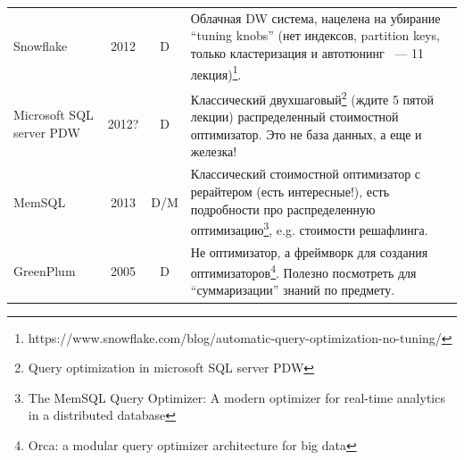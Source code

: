 \documentclass{beamer}
\begin{document}
\begin{frame}[allowframebreaks]
\begin{table}
\begin{longtable}{|p{2cm}|c|c|p{7.2cm}|}
	
	Snowflake & 2012 & D & Облачная DW система, нацелена на убирание ``tuning knobs'' (нет индексов, partition keys, только кластеризация и автотюнинг ~--- 11 лекция)\footnote{https://www.snowflake.com/blog/automatic-query-optimization-no-tuning/}.\\
	
	Microsoft SQL server PDW & 2012? & D & Классический двухшаговый\footnote{Query optimization in microsoft SQL server PDW} (ждите 5 пятой лекции) распределенный стоимостной оптимизатор. Это не база данных, а еще и железка!\\
	
	MemSQL & 2013 & D/M & Классический стоимостной оптимизатор с рерайтером (есть интересные!), есть подробности про распределенную оптимизацию\footnote{The MemSQL Query Optimizer: A modern optimizer for real-time analytics in a distributed database}, e.g. стоимости решафлинга.\\
	
	GreenPlum & 2005 & D & Не оптимизатор, а фреймворк для создания оптимизаторов\footnote{Orca: a modular query optimizer architecture for big data}. Полезно посмотреть для ``суммаризации'' знаний по предмету.\\

	
	
	
	
	
	\hline
\end{longtable}

\end{table}	

\end{frame}
\end{document}
